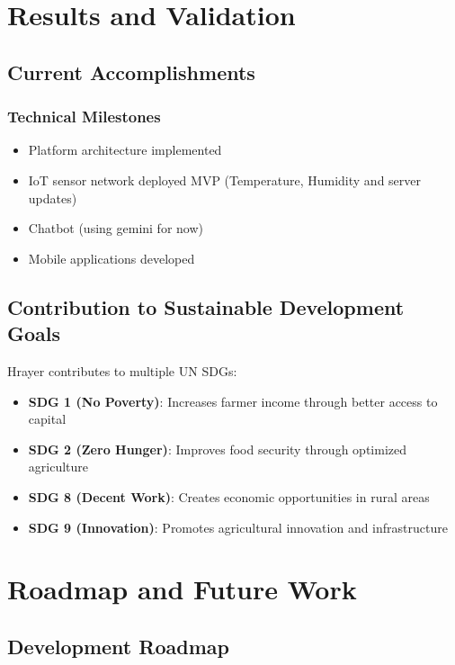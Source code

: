 \documentclass[9pt,twocolumn,twoside]{article}
\begin{document}
\section{Results and Validation} \label{sec:results}

\subsection{Current Accomplishments}

\subsubsection{Technical Milestones}

\begin{itemize}
  \item Platform architecture implemented
  \item IoT sensor network deployed MVP (Temperature, Humidity and server updates)
  \item Chatbot (using gemini for now)
  \item Mobile applications developed
\end{itemize}

\subsection{Contribution to Sustainable Development Goals}

Hrayer contributes to multiple UN SDGs:

\begin{itemize}
  \item \textbf{SDG 1 (No Poverty)}: Increases farmer income through better access to capital
  \item \textbf{SDG 2 (Zero Hunger)}: Improves food security through optimized agriculture
  \item \textbf{SDG 8 (Decent Work)}: Creates economic opportunities in rural areas
  \item \textbf{SDG 9 (Innovation)}: Promotes agricultural innovation and infrastructure
\end{itemize}

\section{Roadmap and Future Work} \label{sec:conclusion}

\subsection{Development Roadmap}
\end{document}
